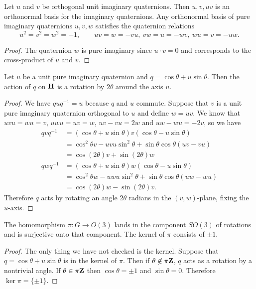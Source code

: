 \documentclass[12pt]{article}
\begin{document}
\begin{cor}
  Let $u$ and $v$ be orthogonal unit imaginary quaternions. Then $u,v,uv$ is an orthonormal basis for the imaginary quaternions. Any orthonormal basis of pure imaginary quaternions $u,v,w$ satisfies the quaternion relations
  \[u^2=v^2=w^2=-1,\qquad uv=w=-vu,\ vw=u=-wv,\ wu=v=-uw.\]
\end{cor}
\begin{proof}
  The quaternion $w$ is pure imaginary since $u\cdot v=0$ and corresponds to the cross-product of $u$ and $v$.
\end{proof}

\begin{thm}
Let $u$ be a unit pure imaginary quaternion and $q=\cos\theta+u\sin\theta$. Then the action of $q$ on $\mathbf{H}$ is a rotation by $2\theta$ around the axis $u$.
\end{thm}
\begin{proof}
  We have $quq^{-1}=u$ because $q$ and $u$ commute. Suppose that $v$ is a unit pure imaginary quaternion orthogonal to $u$ and define $w=uv$. We know that $uvu=wu=v$, $uwu=uv=w$,  $uv-vu=2w$ and $uw-wu=-2v$, so we have
  \begin{align*}
    qvq^{-1}&=(\cos\theta+u\sin\theta)v(\cos\theta-u\sin\theta)\\
    &=\cos^2\theta v-uvu\sin^2\theta+\sin\theta\cos\theta(uv-vu)\\
    &=\cos(2\theta)v+\sin(2\theta)w\\
    qwq^{-1}&=(\cos\theta+u\sin\theta)w(\cos\theta-u\sin\theta)\\
    &=\cos^2\theta w-uwu\sin^2\theta+\sin\theta\cos\theta(uw-wu)\\
    &=\cos(2\theta)w-\sin(2\theta)v.
  \end{align*}
  Therefore $q$ acts by rotating an angle $2\theta$ radians in the $(v,w)$-plane, fixing the $u$-axis.
\end{proof}

\begin{cor}
  The homomorphism $\pi\colon G\to O(3)$ lands in the component $SO(3)$ of rotations and is surjective onto that component. The kernel of $\pi$ consists of $\pm 1$.
\end{cor}
\begin{proof}
  The only thing we have not checked is the kernel. Suppose that $q=\cos\theta+u\sin\theta$ is in the kernel of $\pi$. Then if $\theta\not\in\pi\mathbf{Z}$, $q$ acts as a rotation by a nontrivial angle. If $\theta\in\pi\mathbf{Z}$ then $\cos\theta=\pm 1$ and $\sin\theta=0$. Therefore $\ker\pi=\{\pm 1\}$.
\end{proof}
\end{document}
